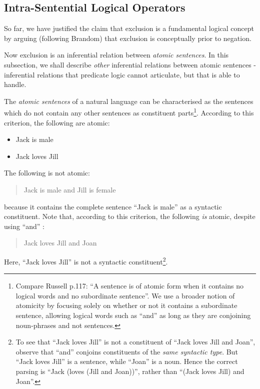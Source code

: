 \subsection{Intra-Sentential Logical Operators}

So far, we have justified the claim that exclusion is a fundamental logical concept by arguing (following Brandom) that exclusion is conceptually prior to negation. 

Now exclusion is an inferential relation between \emph{atomic sentences}. 
In this subsection, we shall describe \emph{other} inferential relations between atomic sentences - inferential relations that predicate logic cannot articulate, but that \ELFULL{} is able to handle.

The \emph{atomic sentences} of a natural language can be
characterised as the sentences which do not contain any other
sentences as constituent parts\footnote{Compare Russell \cite{russell}
  p.117: ``A sentence is of atomic form when it contains no logical
  words and no subordinate sentence''. We use a broader notion of
  atomicity by focusing solely on whether or not it contains a
  subordinate sentence, allowing logical words such as ``and'' as long
  as they are conjoining noun-phrases and not sentences.}.  According
to this criterion, the following are atomic:

\begin{itemize}

\item Jack is male
\item Jack loves Jill
\end{itemize}

\NI The following is not atomic:

\begin{quote}
  Jack is male and Jill is female
\end{quote}

\NI because it contains the complete sentence ``Jack is male'' as a
syntactic constituent.  Note that, according to this criterion, the
following \emph{is} atomic, despite using ``and'' :

\begin{quote}
  Jack loves Jill and Joan
\end{quote}

\NI Here, ``Jack loves Jill'' is not a syntactic constituent\footnote{To see that ``Jack loves Jill'' is not a constituent of ``Jack loves Jill and Joan'', observe that ``and'' conjoins constituents of the \emph{same syntactic type}. But ``Jack loves Jill'' is a sentence, while ``Joan'' is a noun. Hence the correct parsing is ``Jack (loves (Jill and Joan))'', rather than ``(Jack loves Jill) and Joan''.}.

